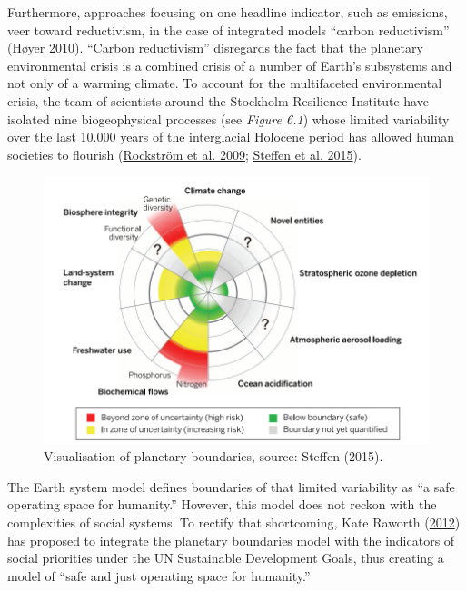 \documentclass[a4paper, nobind]{templates/ociamthesis}
\begin{document}
Furthermore, approaches focusing on one headline indicator, such as emissions, veer toward reductivism, in the case of integrated models ``carbon reductivism'' (\protect\hyperlink{ref-hoyer_seven_2010}{Høyer 2010}). ``Carbon reductivism'' disregards the fact that the planetary environmental crisis is a combined crisis of a number of Earth's subsystems and not only of a warming climate. To account for the multifaceted environmental crisis, the team of scientists around the Stockholm Resilience Institute have isolated nine biogeophysical processes (see \emph{Figure 6.1}) whose limited variability over the last 10.000 years of the interglacial Holocene period has allowed human societies to flourish (\protect\hyperlink{ref-rockstrom_planetary_2009}{Rockström et al. 2009}; \protect\hyperlink{ref-steffen_planetary_2015}{Steffen et al. 2015}).

\begin{figure}
\includegraphics[width=1\linewidth]{./figures/planetary_boundaries} \caption[Planetary boundaries]{Visualisation of planetary boundaries, source: Steffen (2015).}\label{fig:unnamed-chunk-5}
\end{figure}

The Earth system model defines boundaries of that limited variability as ``a safe operating space for humanity.'' However, this model does not reckon with the complexities of social systems. To rectify that shortcoming, Kate Raworth (\protect\hyperlink{ref-raworth_safe_2012}{2012}) has proposed to integrate the planetary boundaries model with the indicators of social priorities under the UN Sustainable Development Goals, thus creating a model of ``safe and just operating space for humanity.''
\end{document}
